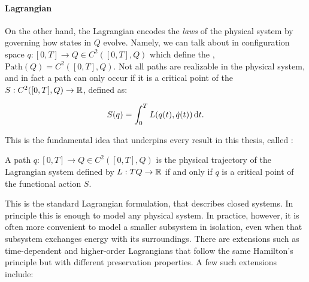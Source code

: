 \newcommand{\action}{S}

\paragraph{Lagrangian}
On the other hand, the Lagrangian encodes the \emph{laws} of the physical system by governing how states in $Q$ evolve. Namely, we can talk about  in configuration space $q: [0, T] \to Q \in C^2([0, T], Q)$ which define the , $\mathrm{Path}(Q) = C^2([0, T], Q)$. Not all paths are realizable in the physical system, and in fact a path can only occur if it is a critical point of the  $\action: C^2([0, T], Q)\to \RR$, defined as:

\begin{equation}
	\action(q) = \int_0^T L(q(t), \dot{q}(t)) \odif{t}.
	\label{eq:action}
\end{equation}

This is the fundamental idea that underpins every result in this thesis, called :

\begin{definition}\label{def:hamiltons-principle}
	A path $q: [0, T] \to Q \in C^2([0, T], Q)$ is the physical trajectory of the Lagrangian system defined by $L : TQ \to {\mathbb{R}}$ if and only if $q$ is a critical point of the functional action $\action$.
\end{definition}

This is the standard Lagrangian formulation, that describes closed systems. In principle this is enough to model any physical system. In practice, however, it is often more convenient to model a smaller subsystem in isolation, even when that subsystem exchanges energy with its surroundings. There are extensions such as time-dependent and higher-order Lagrangians that follow the same Hamilton's principle but with different preservation properties. A few such extensions include:

